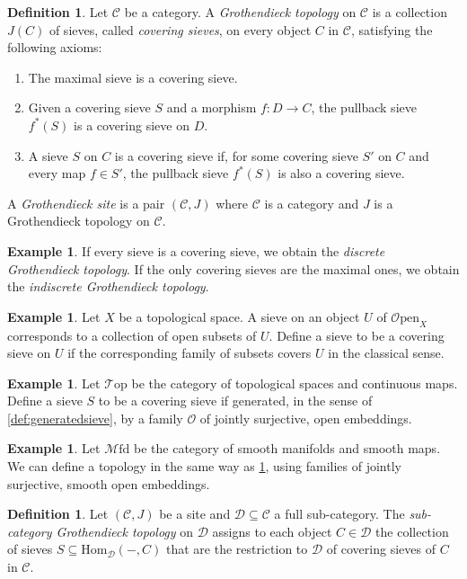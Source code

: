 \documentclass[10pt]{amsart}
\newcommand{\C}{\mathscr{C}}
\newcommand{\D}{\mathscr{D}}
\newcommand{\Hom}{\mathrm{Hom}}
\newcommand{\Top}{\mathscr{T}\mathrm{op}}
\newcommand{\Mfd}{\mathscr{M}\mathrm{fd}}
\newcommand{\Open}{\mathscr{O}\mathrm{pen}}
\theoremstyle{definition}
\newtheorem{definition}[equation]{Definition}
\newtheorem{example}[equation]{Example}
\theoremstyle{remark}
\numberwithin{equation}{section}
\begin{document}
	\begin{definition}
		Let $\C$ be a category. A \emph{Grothendieck topology} on $\C$ is a collection $J(C)$ of sieves, called \textit{covering sieves}, on every object $C$ in $\C$, satisfying the following axioms:
		\begin{enumerate}
			\item The maximal sieve is a covering sieve.
			\item Given a covering sieve $S$ and a morphism $f\colon D \to C$, the pullback sieve $f^*(S)$ is a covering sieve on $D$.
			\item A sieve $S$ on $C$ is a covering sieve if, for some covering sieve $S'$ on $C$ and every map $f\in S'$, the pullback sieve $f^*(S)$ is also a covering sieve. 
		\end{enumerate}
		A \emph{Grothendieck site} is a pair $(\C, J)$ where $\C$ is a category and $J$ is a Grothendieck topology on $\C$.
	\end{definition}
	\begin{example}If every sieve is a covering sieve, we obtain the \emph{discrete Grothendieck topology}. If the only covering sieves are the maximal ones, we obtain the \textit{indiscrete Grothendieck topology}.
	\end{example}
	\begin{example}
		Let $X$ be a topological space. A sieve on an object $U$ of $\Open_X$ corresponds to a collection of open subsets of $U$. Define a sieve to be a covering sieve on $U$ if the corresponding family of subsets covers $U$ in the classical sense.
	\end{example}
	\begin{example}\label{ex:top}
		Let $\Top$ be the category of topological spaces and continuous maps. Define a sieve $S$ to be a covering sieve if generated, in the sense of \cref{def:generatedsieve}, by a family $\mathscr O$ of jointly surjective, open embeddings. 
	\end{example}
	\begin{example}Let $\Mfd$ be the category of smooth manifolds and smooth maps. We can define a topology in the same way as \cref{ex:top}, using families of jointly surjective, smooth open embeddings. 
	\end{example}
	\begin{definition}\label{def:indtop}
		Let $(\C,J)$ be a site and $\D\subseteq\C$ a full sub-category. The \emph{sub-category Grothendieck topology} on $\D$ assigns to each object $C\in\D$ the collection of sieves $S\subseteq\Hom_{\D}(-,C)$ that are the restriction to $\D$ of covering sieves of $C$ in $\C$.
	\end{definition}
\end{document}
